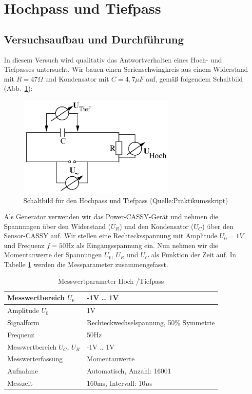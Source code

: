 \documentclass[12pt,a4paper]{article}
\begin{document}
\section{Hochpass und Tiefpass}
\subsection{Versuchsaufbau und Durchführung}
In diesem Versuch wird qualitativ das Antwortverhalten eines Hoch- und Tiefpasses untersucht. Wir bauen einen Serienschwingkreis aus einem Widerstand mit $R=47\Omega$ und Kondensator mit $C=4,7\mu F$ auf, gemäß folgendem Schaltbild (Abb.~\ref{HT_Schaltbild}):
\begin{figure}[H]
	\centering
	\includegraphics[width=0.7\textwidth]{Daten/Schaltkreis_HochTiefpass.png}
	\caption{Schaltbild für den Hochpass und Tiefpass (Quelle:Praktikumsskript)}
	\label{HT_Schaltbild}
\end{figure}
Als Generator verwenden wir das Power-CASSY-Gerät und nehmen die Spannungen über den Widerstand ($U_R$) und den Kondensator ($U_C$) über den Sensor-CASSY auf. Wir stellen eine Rechtecksspannung mit Amplitude $U_0=1V$ und Frequenz $f=50$Hz als Eingangsspannung ein. Nun nehmen wir die Momentanwerte der Spannungen $U_0$, $U_R$ und $U_C$ als Funktion der Zeit auf. In Tabelle \ref{table:Messwerterfassung_HT} werden die Messparameter zusammengefasst.
\begin{table}[H]
	\centering
	\begin{tabular}{|l|l|}
		\hline
		Messwertbereich $U_0$&-1V .. 1V\\
		\hline
		Amplitude $U_0$&1V\\
		\hline
		Signalform&Rechteckwechselspannung, 50\% Symmetrie\\
		\hline
		Frequenz&50Hz\\
		\hline
		Messwertbereich $U_C$, $U_R$&-1V .. 1V\\
		\hline
		Messwerterfassung&Momentanwerte\\
		\hline
		Aufnahme&Automatisch, Anzahl: 16001\\
		\hline
		Messzeit&160ms, Intervall: $10\mu$s\\
		\hline
	\end{tabular}
	\caption{Messwertparameter Hoch-/Tiefpass}
	\label{table:Messwerterfassung_HT}
\end{table}
\end{document}
